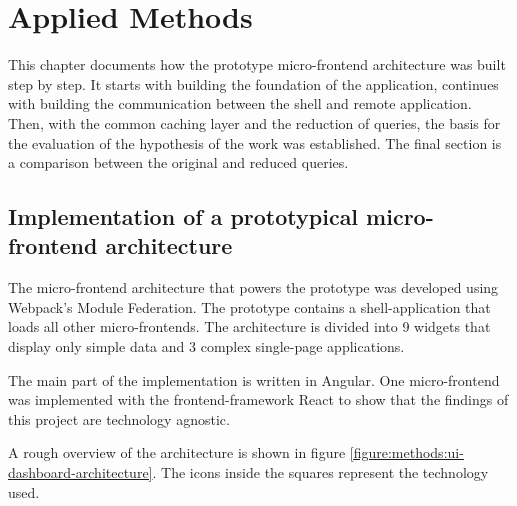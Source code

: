 \chapter{Applied Methods}\label{chapter:applied-methods}

This chapter documents how the prototype micro-frontend architecture was built step by step. It starts with building the foundation of the application, continues with building the communication between the shell and remote application. Then, with the common caching layer and the reduction of queries, the basis for the evaluation of the hypothesis of the work was established. The final section is a comparison between the original and reduced queries.

\section{Implementation of a prototypical micro-frontend architecture}

The micro-frontend architecture that powers the prototype was developed using Webpack's Module Federation. The prototype contains a shell-application that loads all other micro-frontends. The architecture is divided into 9 widgets that display only simple data and 3 complex single-page applications.

The main part of the implementation is written in Angular. One micro-frontend was implemented with the frontend-framework React to show that the findings of this project are technology agnostic.



A rough overview of the architecture is shown in figure \ref{figure:methods:ui-dashboard-architecture}. The icons inside the squares represent the technology used.

